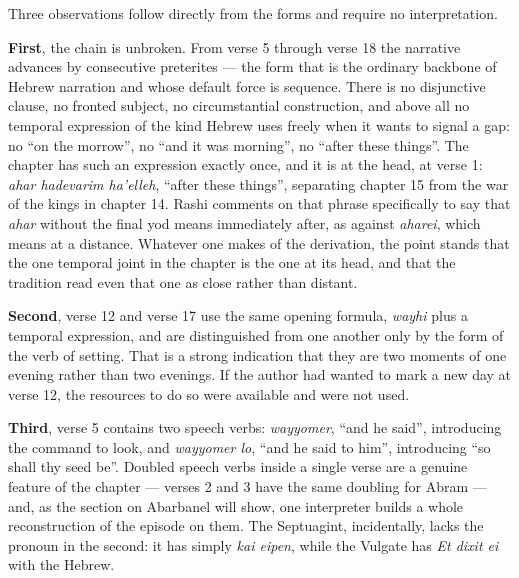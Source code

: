 Three observations follow directly from the forms and require no interpretation.

\textbf{First}, the chain is unbroken. From verse 5 through verse 18 the
narrative advances by consecutive preterites --- the form that is the ordinary
backbone of Hebrew narration and whose default force is sequence. There is no
disjunctive clause, no fronted subject, no circumstantial construction, and
above all no temporal expression of the kind Hebrew uses freely when it wants to
signal a gap: no ``on the morrow'', no ``and it was morning'', no ``after these
things''. The chapter has such an expression exactly once, and it is at the
head, at verse 1: \textit{ahar hadevarim ha'elleh}, ``after these things'',
separating chapter 15 from the war of the kings in chapter 14. Rashi comments on
that phrase specifically to say that \textit{ahar} without the final yod means
immediately after, as against \textit{aharei}, which means at a
distance. Whatever one makes of the derivation, the point stands that the
one temporal joint in the chapter is the one at its head, and that the tradition
read even that one as close rather than distant.

\textbf{Second}, verse 12 and verse 17 use the same opening formula,
\textit{wayhi} plus a temporal expression, and are distinguished from one
another only by the form of the verb of setting. That is a strong indication
that they are two moments of one evening rather than two evenings. If the author
had wanted to mark a new day at verse 12, the resources to do so were available
and were not used.

\textbf{Third}, verse 5 contains two speech verbs: \textit{wayyomer}, ``and he
said'', introducing the command to look, and \textit{wayyomer lo}, ``and he said
to him'', introducing ``so shall thy seed be''. Doubled speech verbs inside a
single verse are a genuine feature of the chapter --- verses 2 and 3 have the
same doubling for Abram --- and, as the section on Abarbanel will show, one
interpreter builds a whole reconstruction of the episode on them. The
Septuagint, incidentally, lacks the pronoun in the second: it has simply
\textit{kai eipen}, while the Vulgate has \textit{Et dixit ei} with the Hebrew.

